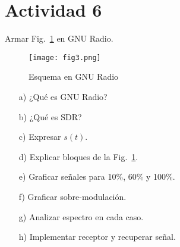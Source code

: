 \section{Actividad 6}

Armar Fig.~\ref{fig:3} en GNU Radio.  

\begin{figure}[h!]
    \centering
    \texttt{[image: fig3.png]}
    \caption{Esquema en GNU Radio}
    \label{fig:3}
\end{figure}

\begin{itemize}
    \item[a)] ¿Qué es GNU Radio?  
    \item[b)] ¿Qué es SDR?  
    \item[c)] Expresar $s(t)$.  
    \item[d)] Explicar bloques de la Fig.~\ref{fig:3}.  
    \item[e)] Graficar señales para 10\%, 60\% y 100\%.  
    \item[f)] Graficar sobre-modulación.  
    \item[g)] Analizar espectro en cada caso.  
    \item[h)] Implementar receptor y recuperar señal.  
\end{itemize}